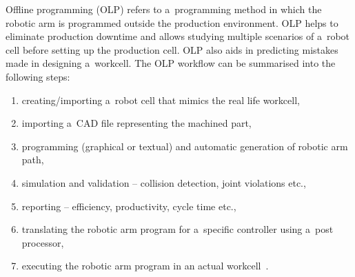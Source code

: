 Offline programming  (OLP) refers to a~programming method in which the robotic arm is programmed outside the production environment. OLP helps to eliminate production downtime and allows studying multiple scenarios of a~robot cell before setting up the production cell. OLP also aids in predicting mistakes made in designing a~workcell. The OLP workflow can be summarised into the following steps:

\begin{enumerate}
  \item creating/importing a~robot cell that mimics the real life workcell,
  \item importing a~CAD file representing the machined part,
  \item programming (graphical or textual) and automatic generation of robotic arm path,
  \item simulation and validation -- collision detection, joint violations etc.,
  \item reporting -- efficiency, productivity, cycle time etc.,
  \item translating the robotic arm program for a~specific controller using a~post processor,
  \item executing the robotic arm program in an actual workcell~\cite{offlinesteps}.
\end{enumerate}



